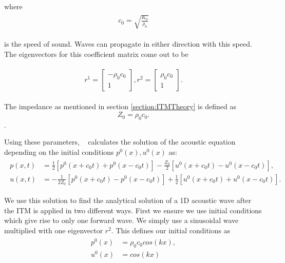where 
\begin{align}
    \begin{split}
        c_0 = \sqrt{\frac{K_0}{\rho_0}}
    \end{split}
\end{align}

is the speed of sound. Waves can propagate in either direction with this speed. The eigenvectors for this coefficient matrix come out to be

\begin{align}
    \begin{split}
        r^1 = \begin{bmatrix}
            -\rho_0 c_0 \\
            1
        \end{bmatrix}, 
        r^2 = \begin{bmatrix}
            \rho_0 c_0 \\
            1
        \end{bmatrix}.
    \end{split}
\end{align}

The impedance as mentioned in section \ref{section:ITMTheory} is defined as
\begin{equation}
    Z_0 = \rho_0 c_0.
\end{equation}.

Using these parameters, ~\parencite[Sec. 2.8]{leveque_2002} calculates the solution of the acoustic equation depending on the initial conditions $p^0(x), u^0(x)$ as:
\begin{align}
    \begin{split}
        p(x,t) &= \frac{1}{2}\left[p^0\left(x + c_0t\right) + p^0\left(x - c_0t\right)\right] - \frac{Z_0}{2}\left[u^0\left(x+c_0t\right) - u^0\left(x-c_0t\right)\right], \\
        u(x,t) &= -\frac{1}{2Z_0}\left[p^0\left(x+c_0t\right) - p^0\left(x-c_0t\right)\right] + \frac{1}{2}\left[u^0\left(x+c_0t\right) + u^0\left(x-c_0t\right)\right] .
    \end{split}
    \label{eq:solutionacoustic}
\end{align}

We use this solution to find the analytical solution of a 1D acoustic wave after the \ac{ITM} is applied in two different ways. First we ensure we use initial conditions which give rise to only one forward wave. We simply use a sinusoidal wave multiplied with one eigenvector $r^2$.
This defines our initial conditions as
\begin{align}
    \begin{split}
        p^0\left(x\right) &= \rho_0c_0cos\left(kx\right), \\
        u^0\left(x\right) &= cos\left(kx\right)
    \end{split}
    \label{eq:initialconditions}
\end{align}

